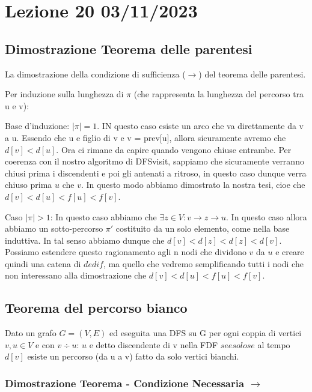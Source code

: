\section{Lezione 20 03/11/2023}

\subsection{Dimostrazione Teorema delle parentesi}

La dimostrazione della condizione di sufficienza ($\rightarrow$) del teorema delle parentesi.

Per induzione sulla lunghezza di $\pi$ (che rappresenta la lunghezza del percorso tra u e v):

Base d'induzione: $|\pi| = 1$. IN questo caso esiste un arco che va direttamente da v a u. Essendo che u e figlio di v e v = prev[u], allora sicuramente avremo che $d[v] < d[u]$. Ora ci rimane da capire quando vengono chiuse entrambe. Per coerenza con il nostro algoritmo di DFSvisit, sappiamo che sicuramente verranno chiusi prima i discendenti e poi gli antenati a ritroso, in questo caso dunque verra chiuso prima $u$ che $v$.
In questo modo abbiamo dimostrato la nostra tesi, cioe che $d[v] < d[u] < f[u] < f[v]$.

Caso $|\pi| > 1$:
In questo caso abbiamo che $\exists z \in V: v\rightarrow z \rightarrow u$. In questo caso allora abbiamo un sotto-percorso $\pi\prime$ costituito da un solo elemento, come nella base induttiva. In tal senso abbiamo dunque che $d[v] < d[z] < d[z] < d[v]$.
Possiamo estendere questo ragionamento agli n nodi che dividono $v$ da $u$ e creare quindi una catena di $d e di f$, ma quello che vedremo semplificando tutti i nodi che non interessano alla dimostrazione che $d[v] < d[u] < f[u] < f[v]$.

\subsection{Teorema del percorso bianco}

Dato un grafo $G = (V,E)$ ed eseguita una DFS su G per ogni coppia di vertici $v,u \in V$ e con $v\div u$:
$u$ e detto discendente di v nella FDF $se e solo se $ al tempo $d[v]$ esiste un percorso (da u a v) fatto da solo vertici bianchi.

\subsubsection{Dimostrazione Teorema - Condizione Necessaria $\rightarrow$}

